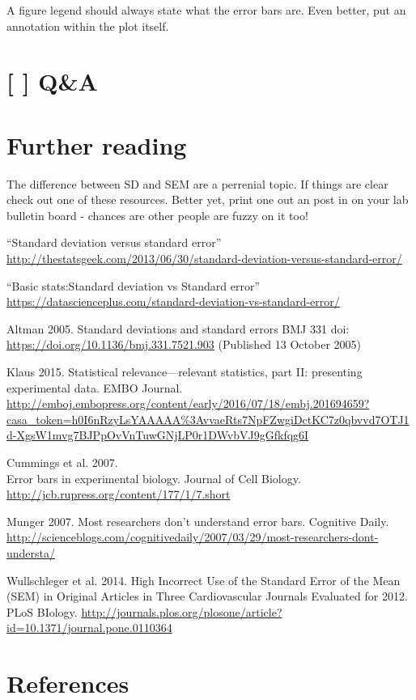 \documentclass[]{book}
\theoremstyle{definition}
\theoremstyle{definition}
\theoremstyle{definition}
\theoremstyle{remark}
\begin{document}
A figure legend should always state what the error bars are. Even
better, put an annotation within the plot itself.

\section{{[} {]} Q\&A}\label{qa-2}

\section*{Further reading}\label{further-reading-12}

The difference between SD and SEM are a perrenial topic. If things are
clear check out one of these resources. Better yet, print one out an
post in on your lab bulletin board - chances are other people are fuzzy
on it too!

``Standard deviation versus standard error''
\url{http://thestatsgeek.com/2013/06/30/standard-deviation-versus-standard-error/}

``Basic stats:Standard deviation vs Standard error''
\url{https://datascienceplus.com/standard-deviation-vs-standard-error/}

Altman 2005. Standard deviations and standard errors BMJ 331 doi:
\url{https://doi.org/10.1136/bmj.331.7521.903} (Published 13 October
2005)

Klaus 2015. Statistical relevance---relevant statistics, part II:
presenting experimental data. EMBO Journal.
\url{http://emboj.embopress.org/content/early/2016/07/18/embj.201694659?casa_token=h0I6nRzyLsYAAAAA\%3AvvaeRts7NpFZwgiDctKC7z0qbvvd7OTJ1d-XgsW1mvg7BJPpOvVnTuwGNjLP0r1DWvbVJ9gGfkfqg6I}

Cummings et al. 2007.\\
Error bars in experimental biology. Journal of Cell Biology.
\url{http://jcb.rupress.org/content/177/1/7.short}

Munger 2007. Most researchers don't understand error bars. Cognitive
Daily.
\url{http://scienceblogs.com/cognitivedaily/2007/03/29/most-researchers-dont-understa/}

Wullschleger et al. 2014. High Incorrect Use of the Standard Error of
the Mean (SEM) in Original Articles in Three Cardiovascular Journals
Evaluated for 2012. PLoS BIology.
\url{http://journals.plos.org/plosone/article?id=10.1371/journal.pone.0110364}

\section*{References}\label{references-12}
\end{document}
